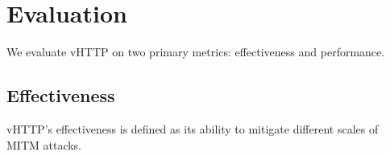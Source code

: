 \section{Evaluation}
\label{sec:eval}

We evaluate vHTTP on two primary metrics: effectiveness and performance.

\subsection{Effectiveness}

vHTTP's effectiveness is defined as its ability to mitigate different scales of
MITM attacks.
